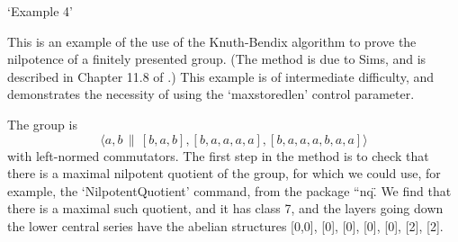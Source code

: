 `Example 4'

This is an  example of the use  of the Knuth-Bendix algorithm to prove
the nilpotence of a  finitely presented group.  (The method is due  to
Sims, and is described in Chapter 11.8 of \cite{Sims94}.) This example
is of intermediate difficulty, and demonstrates the necessity of using
the `maxstoredlen' control parameter.

The group  is   $$  \langle a,b   \,\|  \,[b,a,b],
[b,a,a,a,a],  [b,a,a,a,b,a,a] \rangle $$ with left-normed commutators.
The first step  in the  method is to   check that there is  a  maximal
nilpotent quotient of the group, for which we  could use, for example,
the {\GAP}   `NilpotentQuotient'   command, from   the  package
``nq\".  We find that  there is a  maximal  such quotient, and it  has
class 7, and the  layers going down  the lower central series have the
abelian structures [0,0], [0], [0], [0], [0], [2], [2].

